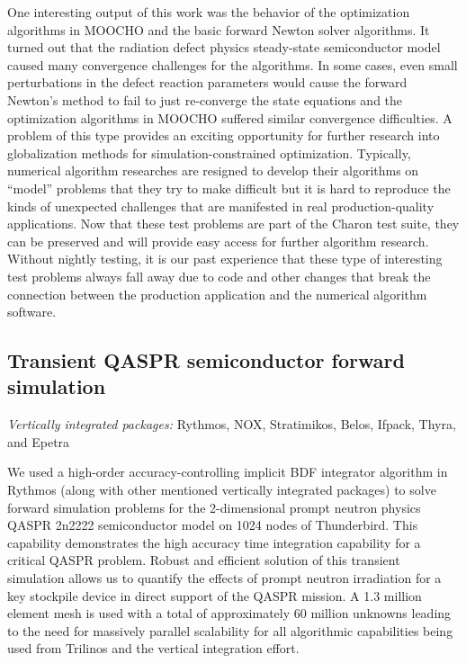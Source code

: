 \documentclass[pdf,ps2pdf,11pt]{SANDreport}
\begin{document}

One interesting output of this work was the behavior of the optimization
algorithms in MOOCHO and the basic forward Newton solver algorithms.  It turned out
that the radiation defect physics steady-state semiconductor model caused many
convergence challenges for the algorithms.  In some cases, even small
perturbations in the defect reaction parameters would cause the forward
Newton's method to fail to just re-converge the state equations and the
optimization algorithms in MOOCHO suffered similar convergence difficulties.
A problem of this type provides an exciting opportunity for further
research into globalization methods for simulation-constrained optimization.
Typically, numerical algorithm researches are resigned to develop their
algorithms on ``model'' problems that they try to make difficult but it is
hard to reproduce the kinds of unexpected challenges that are manifested in
real production-quality applications.  Now that these test
problems are part of the Charon test suite, they can be preserved and will
provide easy access for further algorithm research.  Without nightly testing,
it is our past experience that these type of interesting test problems always
fall away due to code and other changes that break the connection between the
production application and the numerical algorithm software.


%
\subsection{Transient QASPR semiconductor forward simulation}
%

{}\noindent\textit{Vertically integrated packages:} Rythmos, NOX, Stratimikos,
Belos, Ifpack, Thyra, and Epetra

We used a high-order accuracy-controlling implicit BDF integrator algorithm in
Rythmos (along with other mentioned vertically integrated packages) to solve
forward simulation problems for the 2-dimensional prompt neutron physics
QASPR 2n2222 semiconductor model on 1024 nodes of Thunderbird.  This capability
demonstrates the high accuracy time integration capability for a critical
QASPR problem.  Robust and efficient solution of this transient simulation
allows us to quantify the effects of prompt neutron irradiation for a key
stockpile device in direct support of the QASPR mission.  A 1.3 million element
mesh is used with a total of approximately 60 million unknowns leading to
the need for massively parallel scalability for all algorithmic capabilities
being used from Trilinos and the vertical integration effort. 
\end{document}
